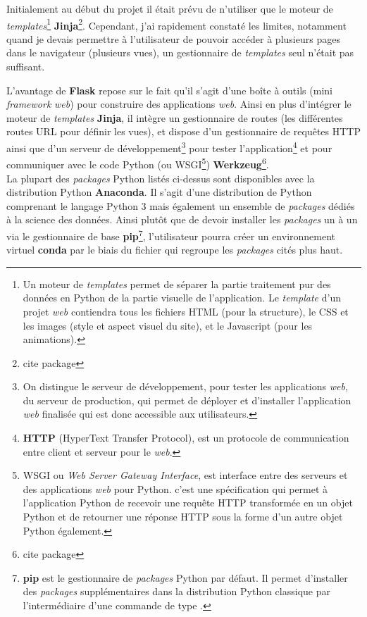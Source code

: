 Initialement au début du projet il était prévu de n'utiliser que le moteur de \textit{templates}\footnote{Un moteur de \textit{templates} permet de séparer la partie traitement pur des données en Python de la partie visuelle de l'application. Le \textit{template} d'un projet \textit{web} contiendra tous les fichiers HTML (pour la structure), le CSS et les images (style et aspect visuel du site), et le Javascript (pour les animations).} \textbf{Jinja}\footnote{cite package}. Cependant, j'ai rapidement constaté les limites, notamment quand je devais permettre à l'utilisateur de pouvoir accéder à plusieurs pages dans le navigateur (plusieurs vues), un gestionnaire de \textit{templates} seul n'était pas suffisant. 

L'avantage de \textbf{Flask} repose sur le fait qu'il s'agit d'une boîte à outils (mini \textit{framework} \textit{web}) pour construire des applications \textit{web}. Ainsi en plus d'intégrer le moteur de \textit{templates} \textbf{Jinja}, il intègre un gestionnaire de routes (les différentes routes URL pour définir les vues), et dispose d'un gestionnaire de requêtes HTTP ainsi que d'un serveur de développement\footnote{On distingue le serveur de développement, pour tester les applications \textit{web}, du serveur de production, qui permet de déployer et d'installer l'application \textit{web} finalisée qui est donc accessible aux utilisateurs.} pour tester l'application\footnote{\textbf{HTTP} (HyperText Transfer Protocol), est un protocole de communication entre client et serveur pour le \textit{web}.} et pour communiquer avec le code Python (ou WSGI\footnote{WSGI ou \textit{Web Server Gateway Interface}, est interface entre des serveurs et des applications \textit{web} pour Python. c'est une spécification qui permet à l'application Python de recevoir une requête HTTP transformée en un objet Python et de retourner une réponse HTTP sous la forme d’un autre objet Python également.}) \textbf{Werkzeug}\footnote{cite package}.\\

La plupart des \textit{packages} Python listés ci-dessus sont disponibles avec la distribution Python \textbf{Anaconda}. Il s'agit d'une distribution de Python comprenant le langage Python 3 mais également un ensemble de \textit{packages} dédiés à la science des données. Ainsi plutôt que de devoir installer les \textit{packages} un à un via le gestionnaire de base \textbf{pip}\footnote{\textbf{pip} est le gestionnaire de \textit{packages} Python par défaut. Il permet d'installer des \textit{packages} supplémentaires dans la distribution Python classique par l'intermédiaire d'une commande de type .}, l'utilisateur pourra créer un environnement virtuel \textbf{conda} par le biais du fichier  qui regroupe les \textit{packages} cités plus haut.\\ 

